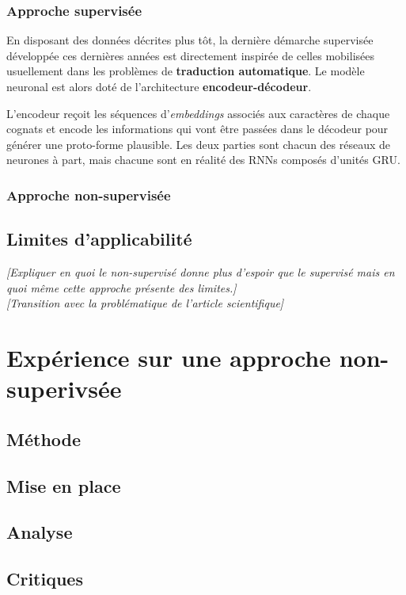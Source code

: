 \documentclass[12pt, french, twoside]{report}
\begin{document}
\subsubsection{Approche supervisée}
En disposant des données décrites plus tôt, la dernière démarche supervisée développée ces dernières années est directement inspirée de celles mobilisées usuellement dans les problèmes de \textbf{traduction automatique}. Le modèle neuronal est alors doté de l'architecture \textbf{encodeur-décodeur}.

L'encodeur reçoit les séquences d'\textit{embeddings} associés aux caractères de chaque cognats et encode les informations qui vont être passées dans le décodeur pour générer une proto-forme plausible. Les deux parties sont chacun des réseaux de neurones à part, mais chacune sont en réalité des RNNs composés d'unités GRU.
\subsubsection{Approche non-supervisée}

\subsection{Limites d'applicabilité}
\textit{[Expliquer en quoi le non-supervisé donne plus d'espoir que le supervisé mais en quoi même cette approche présente des limites.]}\\
\textit{[Transition avec la problématique de l'article scientifique]}\\

\section{Expérience sur une approche non-superivsée}
\subsection{Méthode}
\subsection{Mise en place}

\subsection{Analyse}
\subsection{Critiques}
\end{document}
